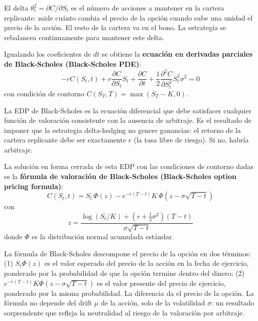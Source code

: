 \documentclass[12pt]{article}
\begin{document}
\begin{intuicionmat}
El delta $\theta_t^2 = \partial C / \partial S_t$ es el n\'umero de acciones a mantener en la cartera replicante: mide cu\'anto cambia el precio de la opci\'on cuando sube una unidad el precio de la acci\'on. El resto de la cartera va en el bono. La estrategia se rebalancea continuamente para mantener este delta.
\end{intuicionmat}

Igualando los coeficientes de $dt$ se obtiene la \textbf{ecuaci\'on en derivadas parciales de Black-Scholes (Black-Scholes PDE)}:
\begin{equation}
  -rC(S_t, t) + r\frac{\partial C}{\partial S_t}S_t + \frac{\partial C}{\partial t} + \frac{1}{2}\frac{\partial^2 C}{\partial S_t^2}S_t^2\sigma^2 = 0
\end{equation}
con condici\'on de contorno $C(S_T, T) = \max(S_T - K, 0)$.

\begin{intuicionmat}
La EDP de Black-Scholes es la ecuaci\'on diferencial que debe satisfacer cualquier funci\'on de valoraci\'on consistente con la ausencia de arbitraje. Es el resultado de imponer que la estrategia delta-hedging no genere ganancias: el retorno de la cartera replicante debe ser exactamente $r$ (la tasa libre de riesgo). Si no, habr\'ia arbitraje.
\end{intuicionmat}

La soluci\'on en forma cerrada de esta EDP con las condiciones de contorno dadas es la \textbf{f\'ormula de valoraci\'on de Black-Scholes (Black-Scholes option pricing formula)}:
\begin{equation}
  C(S_t, t) = S_t\,\Phi(z) - e^{-r(T-t)} K\,\Phi\!\left(z - \sigma\sqrt{T-t}\right)
\end{equation}
con
\begin{equation}
  z = \frac{\log(S_t/K) + \left(r + \frac{1}{2}\sigma^2\right)(T-t)}{\sigma\sqrt{T-t}}
\end{equation}
donde $\Phi$ es la distribuci\'on normal acumulada est\'andar.

\begin{intuicionmat}
La f\'ormula de Black-Scholes descompone el precio de la opci\'on en dos t\'erminos: (1) $S_t \Phi(z)$ es el valor esperado del precio de la acci\'on en la fecha de ejercicio, ponderado por la probabilidad de que la opci\'on termine dentro del dinero; (2) $e^{-r(T-t)} K \Phi(z - \sigma\sqrt{T-t})$ es el valor presente del precio de ejercicio, ponderado por la misma probabilidad. La diferencia da el precio de la opci\'on. La f\'ormula no depende del drift $\mu$ de la acci\'on, solo de la volatilidad $\sigma$: un resultado sorprendente que refleja la neutralidad al riesgo de la valoraci\'on por arbitraje.
\end{intuicionmat}
\end{document}
